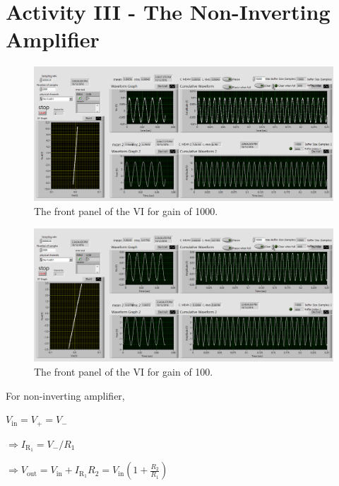\documentclass[11pt]{article}
\begin{document}
\section{Activity III - The Non-Inverting Amplifier}


\begin{figure}[H]
 \begin{center}
  \includegraphics[width=\linewidth/1]{act3_1000times}
  \caption{The front panel of the VI for gain of 1000.}
  \label{fig:act3_1000times}
 \end{center}
\end{figure}

\begin{figure}[H]
 \begin{center}
  \includegraphics[width=\linewidth/1]{act3_100times}
  \caption{The front panel of the VI for gain of 100.}
  \label{fig:act3_100times}
 \end{center}
\end{figure}

For non-inverting amplifier,

$V_{\mathrm{in}}=V_{\mathrm{+}}=V_{\mathrm{-}}$

$\Rightarrow I_{\mathrm {R_{1}}}=V_{\mathrm{-}}/R_{\mathrm {1}}$ 

$\Rightarrow {\displaystyle V_{\mathrm{out}}=V_{\mathrm{in}}+I_{\mathrm {R_{1}}}R_{2}=V_{\mathrm{in}}\left(1+{\frac {R_{2}}{R_{1}}}\right)} $
\end{document}

